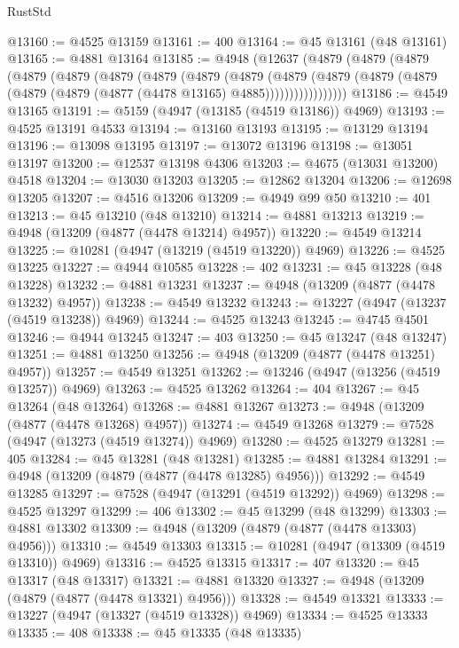 \begin{lexlean}{RustStd}
\begin{coremodule}
{\begin{coremodule}
{{{{{{{{{{{{{{{{{{{{{{{{{{{{{{{{{{{{{{{{{{{{{{{{{{{{{{{{{{{{@13160 := @4525 @13159
@13161 := 400
@13164 := @45 @13161 (@48 @13161)
@13165 := @4881 @13164
@13185 := @4948
    (@12637
      (@4879
        (@4879
          (@4879
            (@4879
              (@4879
                (@4879
                  (@4879
                    (@4879
                      (@4879
                        (@4879
                          (@4879
                            (@4879 (@4879 (@4879 (@4879 (@4877 (@4478 @13165) @4885)))))))))))))))))
@13186 := @4549 @13165
@13191 := @5159 (@4947 (@13185 (@4519 @13186)) @4969)
@13193 := @4525 @13191 @4533
@13194 := @13160 @13193
@13195 := @13129 @13194
@13196 := @13098 @13195
@13197 := @13072 @13196
@13198 := @13051 @13197
@13200 := @12537 @13198 @4306
@13203 := @4675 (@13031 @13200) @4518
@13204 := @13030 @13203
@13205 := @12862 @13204
@13206 := @12698 @13205
@13207 := @4516 @13206
@13209 := @4949 @99 @50
@13210 := 401
@13213 := @45 @13210 (@48 @13210)
@13214 := @4881 @13213
@13219 := @4948 (@13209 (@4877 (@4478 @13214) @4957))
@13220 := @4549 @13214
@13225 := @10281 (@4947 (@13219 (@4519 @13220)) @4969)
@13226 := @4525 @13225
@13227 := @4944 @10585
@13228 := 402
@13231 := @45 @13228 (@48 @13228)
@13232 := @4881 @13231
@13237 := @4948 (@13209 (@4877 (@4478 @13232) @4957))
@13238 := @4549 @13232
@13243 := @13227 (@4947 (@13237 (@4519 @13238)) @4969)
@13244 := @4525 @13243
@13245 := @4745 @4501
@13246 := @4944 @13245
@13247 := 403
@13250 := @45 @13247 (@48 @13247)
@13251 := @4881 @13250
@13256 := @4948 (@13209 (@4877 (@4478 @13251) @4957))
@13257 := @4549 @13251
@13262 := @13246 (@4947 (@13256 (@4519 @13257)) @4969)
@13263 := @4525 @13262
@13264 := 404
@13267 := @45 @13264 (@48 @13264)
@13268 := @4881 @13267
@13273 := @4948 (@13209 (@4877 (@4478 @13268) @4957))
@13274 := @4549 @13268
@13279 := @7528 (@4947 (@13273 (@4519 @13274)) @4969)
@13280 := @4525 @13279
@13281 := 405
@13284 := @45 @13281 (@48 @13281)
@13285 := @4881 @13284
@13291 := @4948 (@13209 (@4879 (@4877 (@4478 @13285) @4956)))
@13292 := @4549 @13285
@13297 := @7528 (@4947 (@13291 (@4519 @13292)) @4969)
@13298 := @4525 @13297
@13299 := 406
@13302 := @45 @13299 (@48 @13299)
@13303 := @4881 @13302
@13309 := @4948 (@13209 (@4879 (@4877 (@4478 @13303) @4956)))
@13310 := @4549 @13303
@13315 := @10281 (@4947 (@13309 (@4519 @13310)) @4969)
@13316 := @4525 @13315
@13317 := 407
@13320 := @45 @13317 (@48 @13317)
@13321 := @4881 @13320
@13327 := @4948 (@13209 (@4879 (@4877 (@4478 @13321) @4956)))
@13328 := @4549 @13321
@13333 := @13227 (@4947 (@13327 (@4519 @13328)) @4969)
@13334 := @4525 @13333
@13335 := 408
@13338 := @45 @13335 (@48 @13335)
}}}}}}}}}}}}}}}}}}}}}}}}}}}}}}}}}}}}}}}}}}}}}}}}}}}}}}}}}}}}
\end{coremodule}}
\end{coremodule}
\end{lexlean}
